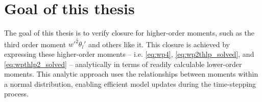 \section{Goal of this thesis}\label{sec:goal-of-this-thesis}

The goal of this thesis is to verify closure for higher-order moments,
such as the third order moment $\overline{w'^2 \theta_l'}$ and others like it.
This closure is achieved by expressing these higher-order moments
-- i.e. \cref{eq:wp4}, \cref{eq:wp2thlp_solved}, and \cref{eq:wpthlp2_solved} --
analytically in terms of readily calculable lower-order moments.
This analytic approach uses the relationships between moments within a normal distribution,
enabling efficient model updates during the time-stepping process.